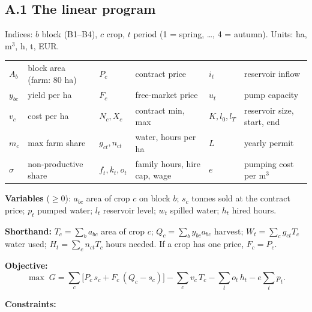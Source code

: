 \subsection*{A.1 \quad The linear program}

Indices: $b$ block (B1--B4), $c$ crop, $t$ period (1 = spring, \dots, 4 = autumn). Units: ha, m$^3$, h, t, EUR.

\smallskip
\noindent\footnotesize
\begin{tabular}{@{}ll@{\qquad}ll@{\qquad}ll@{}}
$A_b$ & block area (farm: 80 ha) & $P_c$ & contract price & $i_t$ & reservoir inflow\\
$y_{bc}$ & yield per ha & $F_c$ & free-market price & $u_t$ & pump capacity\\
$v_c$ & cost per ha & $N_c,X_c$ & contract min, max & $K,l_0,l_T$ & reservoir size, start, end\\
$m_c$ & max farm share & $g_{ct},n_{ct}$ & water, hours per ha & $L$ & yearly permit\\
$\sigma$ & non-productive share & $f_t,k_t,o_t$ & family hours, hire cap, wage & $e$ & pumping cost per m$^3$\\
\end{tabular}
\normalsize

\smallskip
\textbf{Variables} ($\ge 0$): $a_{bc}$ area of crop $c$ on block $b$; $s_c$ tonnes sold at the contract price; $p_t$ pumped water; $l_t$ reservoir level; $w_t$ spilled water; $h_t$ hired hours.

\textbf{Shorthand:} $T_c=\sum_b a_{bc}$ area of crop $c$; $Q_c=\sum_b y_{bc}a_{bc}$ harvest; $W_t=\sum_c g_{ct}T_c$ water used; $H_t=\sum_c n_{ct}T_c$ hours needed. If a crop has one price, $F_c=P_c$.

\textbf{Objective:}
\[
\max\; G=\sum_c\big[P_c\,s_c+F_c\,(Q_c-s_c)\big]-\sum_c v_c\,T_c-\sum_t o_t\,h_t-e\sum_t p_t .
\]

\textbf{Constraints:}

